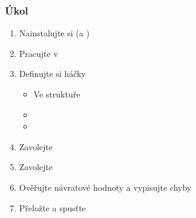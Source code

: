 \begin{frame}
  \frametitle{Úkol}

  \begin{enumerate}
    \item Nainstalujte si  (a )
    \item Pracujte v 
    \item Definujte si háčky
    \begin{itemize}
      \item Ve struktuře 
      \item {}
      \item {}
    \end{itemize}

    \item Zavolejte 
    \item Zavolejte 
    \item Ověřujte návratové hodnoty a vypisujte chyby
    \item Přeložte a spusťte
  \end{enumerate}

\end{frame}

